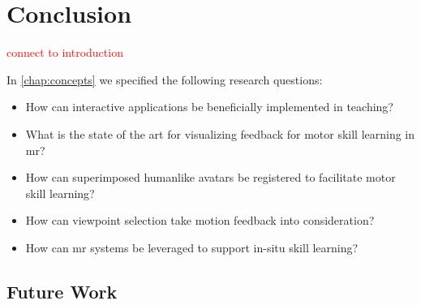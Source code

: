 %
\chapter{Conclusion}
\label{chap:conclusion}

\textcolor{red}{connect to introduction}

In \autoref{chap:concepts} we specified the following research questions:
\begin{itemize}
    \item How can interactive applications be beneficially implemented in teaching?
    \item What is the state of the art for visualizing feedback for motor skill learning in \acrlong{mr}?
    \item How can superimposed humanlike avatars be registered to facilitate motor skill learning?
    \item How can viewpoint selection take motion feedback into consideration?
    \item How can \acrlong{mr} systems be leveraged to support in-situ skill learning?
\end{itemize}

\section{Future Work}
\label{sec:conclusion:future}

\Blindtext[2][2]
